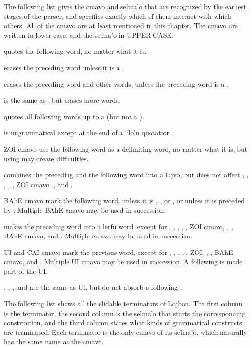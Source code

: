 The following list gives the cmavo and selma'o that are
    recognized by the earliest stages of the parser, and specifies
    exactly which of them interact with which others. All of the
    cmavo are at least mentioned in this chapter. The cmavo are
    written in lower case, and the selma'o in UPPER CASE.

 quotes the following word, no matter what it is.

 erases the preceding word unless it is a .

 erases the preceding word and other words, unless the
    preceding word is a .

 is the same as , but erases more words.

 quotes all following words up to a  (but
    not a ).

 is ungrammatical except at the end of a ``lo'u
    quotation.

ZOI cmavo use the following word as a delimiting word, no
    matter what it is, but using  may create
    difficulties.

 combines the preceding and the following word into a
    lujvo, but does not affect , , , ,
    , ZOI cmavo, , and .

BAhE cmavo mark the following word, unless it is ,
    , or , or unless it is preceded by . Multiple
    BAhE cmavo may be used in succession.

 makes the preceding word into a lerfu word, except
    for , , , , , ZOI cmavo,
    , , BAhE cmavo, and . Multiple 
    cmavo may be used in succession.

UI and CAI cmavo mark the previous word, except for ,
    , , , , ZOI, , , BAhE
    cmavo, and . Multiple UI cmavo may be used in succession.
    A following  is made part of the UI.

, , , and  are the same as
    UI, but do not absorb a following .



The following list shows all the elidable terminators of
    Lojban. The first column is the terminator, the second column
    is the selma'o that starts the corresponding construction, and
    the third column states what kinds of grammatical constructs
    are terminated. Each terminator is the only cmavo of its
    selma'o, which naturally has the same name as the cmavo.

